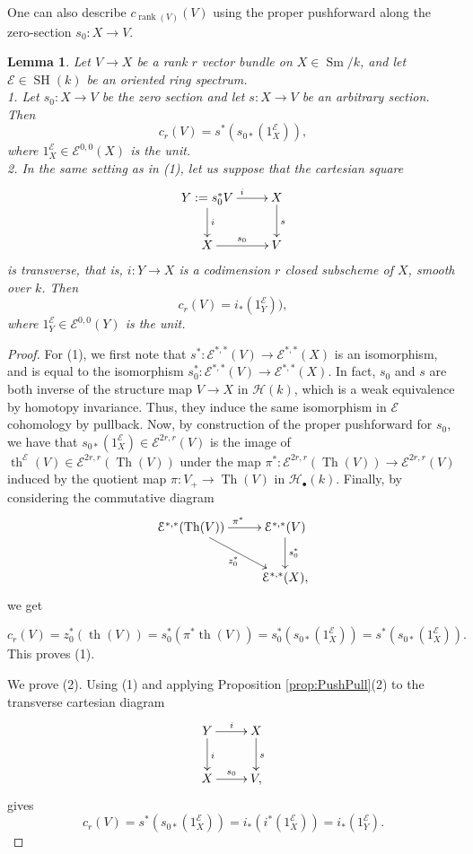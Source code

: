 \documentclass[10pt]{amsart}
\theoremstyle{definition}
\theoremstyle{plain}
\newtheorem{lemma}[defn]{Lemma}
\numberwithin{equation}{section}
\newcommand{\0}{\emptyset}
\newcommand{\sE}{{\mathcal E}}
\newcommand{\sH}{{\mathcal H}}
\newcommand{\SH}{{\operatorname{SH}}}
\newcommand{\Th}{{\operatorname{Th}}}
\newcommand{\Sm}{{\operatorname{Sm}}}
\renewcommand{\th}{{\operatorname{th}}}
\newcommand{\rnk}{{\operatorname{rank}}}
\begin{document}
 One can also describe $c_{\rnk(V)}(V)$ using the proper pushforward along the zero-section $s_0:X\to V$.
\begin{lemma}\label{lem:FirstChernClassFacts} Let $V\to X$ be a rank $r$ vector bundle on $X\in \Sm/k$, and let $\sE\in \SH(k)$ be an oriented ring spectrum. \\[5pt]
1. Let $s_0:X\to V$ be the zero section and let $s:X\to V$ be an arbitrary section. Then  
\begin{equation}\label{eqn:ChernEuler}
c_r(V)=s^*(s_{0*}(1^\sE_X)),
\end{equation}
where $1^\sE_X\in \sE^{0,0}(X)$ is the unit.\\[2pt]
2. In the same setting as in (1), let us suppose that the cartesian square
\[
\xymatrix{
Y:=s_0^*V\ar[r]^i\ar[d]^i&X\ar[d]^s\\
X\ar[r]^{s_0}&V
}
\]
is transverse, that is, $i:Y\to X$ is a codimension $r$ closed subscheme of $X$, smooth over $k$. Then 
\begin{equation}\label{eqn:ChernEuler2}
c_r(V)=i_*(1^\sE_Y)), 
\end{equation}
where $1^\sE_Y\in \sE^{0,0}(Y)$ is the unit.
\end{lemma}

\begin{proof} For (1), we first note that $s^*:\sE^{*,*}(V)\to \sE^{*,*}(X)$ is an isomorphism, and is equal to the isomorphism $s_0^*:\sE^{*,*}(V)\to \sE^{*,*}(X)$. In fact, $s_0$ and $s$ are both inverse of the structure map $V \to X$ in $\sH(k)$, which is a weak equivalence by homotopy invariance. Thus, they induce the same isomorphism in $\sE$ cohomology by pullback. Now, by construction of the proper pushforward for $s_0$, we have that $s_{0*}(1^\sE_X)\in \sE^{2r,r}(V)$ is the image of $\th^\sE(V)\in \sE^{2r,r}(\Th(V))$ under the map 
$\pi^*:\sE^{2r,r}(\Th(V))\to \sE^{2r,r}(V)$ induced by the quotient map $\pi:V_+\to \Th(V)$ in $\sH_\bullet(k)$. Finally, by considering the commutative diagram
\[
\xymatrix{
\sE^{*,*}(\Th(V))\ar[r]^{\pi^*}\ar[dr]_{z_0^*}&\sE^{*,*}(V)\ar[d]^{s_0^*}\\
&\sE^{*,*}(X),
}
\]
we get

$$c_r(V) =z_0^*(\th(V))
=s_0^*(\pi^*\th(V))
=s_0^*(s_{0*}(1^\sE_X))
=s^*(s_{0*}(1^\sE_X)).$$
This proves (1).

We prove (2). Using (1) and applying Proposition \ref{prop:PushPull}(2) to the transverse cartesian diagram
\[
\xymatrix{
Y\ar[r]^i\ar[d]^i&X\ar[d]^s\\
X\ar[r]^{s_0}&V,
}
\]
gives
$$c_r(V)=s^*(s_{0*}(1^\sE_X))=i_*(i^*(1^\sE_X))=i_*(1^\sE_Y).$$
\end{proof}
\end{document}
